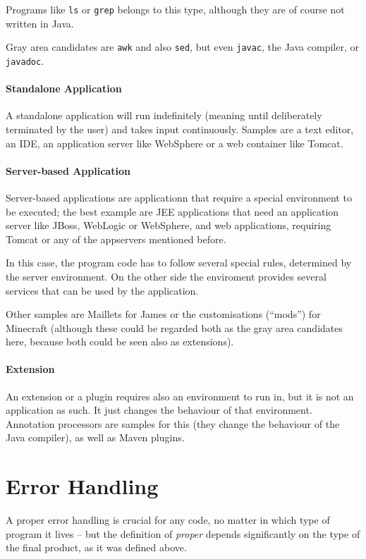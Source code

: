 \documentclass[11pt,a4paper, titlepage, parskip=half, headsepline, footsepline, cleardoublepage=current, headheight=1cm]{scrbook}
\begin{document}
Programs like \verb#ls# or \verb#grep# belongs to this type, although they are of course not written in Java.

Gray area candidates are \verb#awk# and also \verb#sed#, but even \verb#javac#, the Java compiler, or \verb#javadoc#.

\paragraph{Standalone Application}\label{sec:StandaloneApplication}
A standalone application will run indefinitely (meaning until deliberately terminated by the user) and takes input continuously. Samples are a text editor, an IDE, an application server like WebSphere\autocite{IBM_WEBSPHERE} or a web container like Tomcat\autocite{APACHE_TOMCAT}.

\paragraph{Server-based Application}\label{sec:ServerbasedApplication}
Server-based applications are applicationn that require a special environment to be executed; the best example are JEE applications that need an application server like JBoss\autocite{REDHAT_JBOSS}, WebLogic\autocite{ORACLE_WEBLOGIC} or WebSphere\autocite{IBM_WEBSPHERE}, and web applications, requiring Tomcat\autocite{APACHE_TOMCAT} or any of the appservers mentioned before.

In this case, the program code has to follow several special rules, determined by the server environment. On the other side the enviroment provides several services that can be used by the application.

Other samples are Maillets for James\autocite{APACHE_JAMES} or the customisations (“mods”) for Minecraft\autocite{MINECRAFT} (although these could be regarded both as the gray area candidates here, because both could be seen also as extensions).

\paragraph{Extension}\label{sec:Extension}
An extension or a plugin requires also an environment to run in, but it is not an application as such. It just changes the behaviour of that environment. Annotation processors are samples for this (they change the behaviour of the Java compiler), as well as Maven\autocite{APACHE_MAVEN} plugins.

\section{Error Handling}\label{sec:ErrorHandling}
A proper error handling is crucial for any code, no matter in which type of program it lives – but the definition of \textit{proper} depends significantly on the type of the final product, as it was defined above.
\end{document}
